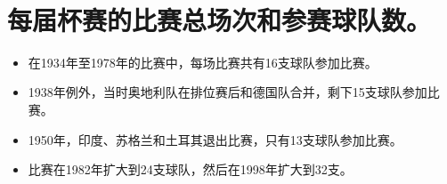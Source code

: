 \documentclass[11pt]{article}
\providecommand{\tightlist}{%
      \setlength{\itemsep}{0pt}\setlength{\parskip}{0pt}}
\begin{document}
    \begin{center}
    \end{center}
    { \hspace*{\fill} \\}
    
    \section{每届杯赛的比赛总场次和参赛球队数。}\label{ux6bcfux5c4aux676fux8d5bux7684ux6bd4ux8d5bux603bux573aux6b21ux548cux53c2ux8d5bux7403ux961fux6570}

\begin{itemize}
\tightlist
\item
  在1934年至1978年的比赛中，每场比赛共有16支球队参加比赛。
\item
  1938年例外，当时奥地利队在排位赛后和德国队合并，剩下15支球队参加比赛。
\item
  1950年，印度、苏格兰和土耳其退出比赛，只有13支球队参加比赛。
\item
  比赛在1982年扩大到24支球队，然后在1998年扩大到32支。
\end{itemize}
\end{document}
